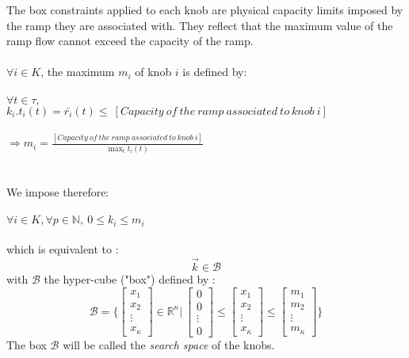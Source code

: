 The box constraints applied to each knob are physical capacity limits imposed by the ramp they are associated with. They reflect that the maximum value of the ramp flow cannot exceed the capacity of the ramp.\\
\\
	$\forall i\in{K}$, the maximum $m_{i}$ of knob $i$ is defined by:
	\\
	\\
	$\forall t \in \tau,$\\
	$k_{i}.t_{i}(t)=\bar{r_{i}}(t)\leq\ \scriptstyle{[Capacity\ of\ the\ ramp\ associated\ to\ knob\ i]}$
	\\
	\\
	$\Rightarrow m_{i}=\frac{[Capacity\ of\ the\ ramp\ associated\ to\ knob\ i]}{\max_{t} t_{i}(t)}$\\
	\\
	\\
	We impose therefore: \\
	\\
	$\forall i\in{K},\forall p\in{\mathbb{N}},\ 0\leq k_{i}\leq m_{i}$\\
\\
which is equivalent to :
\begin{equation}
\label{eq:naive}
	\vec{k}\in\mathscr{B}
\end{equation}
with $\mathscr{B}$ the hyper-cube ("box") defined by :\\
\begin{equation*}
	\mathscr{B}=\big\{\begin{bmatrix}x_{1}\\x_{2}\\\vdots\\x_{\kappa}\end{bmatrix}\in\mathds{R}^{\kappa}|\ \begin{bmatrix}0\\0\\\vdots\\0\end{bmatrix}\leq\begin{bmatrix}x_{1}\\x_{2}\\\vdots\\x_{\kappa}\end{bmatrix}\leq\begin{bmatrix}m_{1}\\m_{2}\\\vdots\\m_{\kappa}\end{bmatrix}\big\}
\end{equation*}
The box $\mathscr{B}$ will be called the \emph{search space} of the knobs.\\




	
